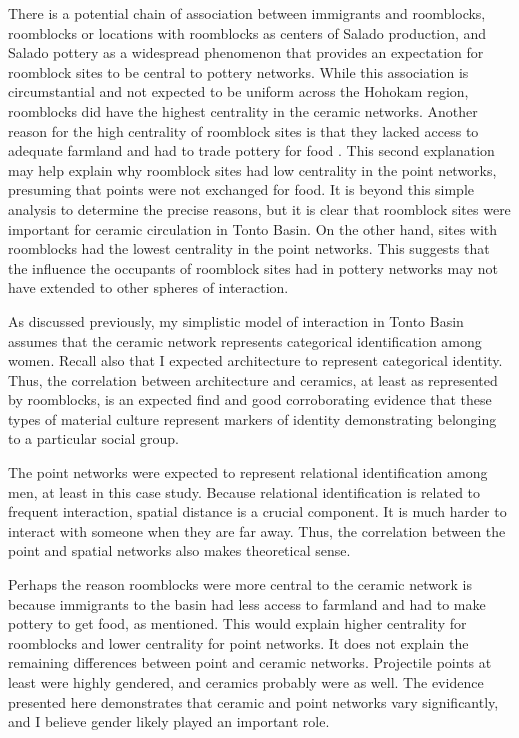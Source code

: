 \documentclass[]{interact}
\theoremstyle{plain}%
\theoremstyle{definition}
\theoremstyle{remark}
\begin{document}
There is a potential chain of association between immigrants and
roomblocks, roomblocks or locations with roomblocks as centers of Salado
production, and Salado pottery as a widespread phenomenon that provides
an expectation for roomblock sites to be central to pottery networks.
While this association is circumstantial and not expected to be uniform
across the Hohokam region, roomblocks did have the highest centrality in
the ceramic networks. Another reason for the high centrality of
roomblock sites is that they lacked access to adequate farmland and had
to trade pottery for food \citep[p.~291]{Clark2004-uw}. This second
explanation may help explain why roomblock sites had low centrality in
the point networks, presuming that points were not exchanged for food.
It is beyond this simple analysis to determine the precise reasons, but
it is clear that roomblock sites were important for ceramic circulation
in Tonto Basin. On the other hand, sites with roomblocks had the lowest
centrality in the point networks. This suggests that the influence the
occupants of roomblock sites had in pottery networks may not have
extended to other spheres of interaction.

As discussed previously, my simplistic model of interaction in Tonto
Basin assumes that the ceramic network represents categorical
identification among women. Recall also that I expected architecture to
represent categorical identity. Thus, the correlation between
architecture and ceramics, at least as represented by roomblocks, is an
expected find and good corroborating evidence that these types of
material culture represent markers of identity demonstrating belonging
to a particular social group.

The point networks were expected to represent relational identification
among men, at least in this case study. Because relational
identification is related to frequent interaction, spatial distance is a
crucial component. It is much harder to interact with someone when they
are far away. Thus, the correlation between the point and spatial
networks also makes theoretical sense.

Perhaps the reason roomblocks were more central to the ceramic network
is because immigrants to the basin had less access to farmland and had
to make pottery to get food, as mentioned. This would explain higher
centrality for roomblocks and lower centrality for point networks. It
does not explain the remaining differences between point and ceramic
networks. Projectile points at least were highly gendered, and ceramics
probably were as well. The evidence presented here demonstrates that
ceramic and point networks vary significantly, and I believe gender
likely played an important role.
\end{document}
